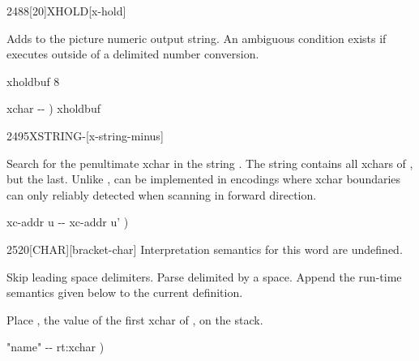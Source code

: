 \begin{worddef}{2488}[20]{XHOLD}[x-hold]%
\item {}

	Adds  to the picture numeric output string.  An ambiguous
	condition exists if  executes outside of a 
	 delimited number conversion.


	\begin{implement} %
	 xholdbuf 8 

	\word{:}   xchar -{}- )
		xholdbuf    \word{-}  \word{;}
	\end{implement}
\end{worddef}


\begin{worddef}[XSTRING-]{2495}{X\bs{}STRING-}[x-string-minus]%
\item {}

	Search for the penultimate xchar in the string .
	The string  contains all xchars of
	, but the last.  Unlike ,
	 can be implemented in encodings where xchar
	boundaries can only reliably detected when scanning in forward
	direction.

	\begin{implement} %
	\word{:}   xc-addr u -{}- xc-addr u' ) \\
	\tab {} \word{+}   \word{-} \word{;}
	\end{implement}
\end{worddef}


\begin{worddef}{2520}{[CHAR]}[bracket-char]%
\interpret
	Interpretation semantics for this word are undefined.

\compile {}

	Skip leading space delimiters.  Parse  delimited by a space.
	Append the run-time semantics given below to the current definition.

\runtime {}

	Place , the value of the first xchar of , on
	the stack.


	\begin{implement} %
	\word{:} \word{[CHAR]}  "name" -{}- rt:xchar ) \\
	\tab {}   \word{;} 
	\end{implement}
\end{worddef}

\endinput
